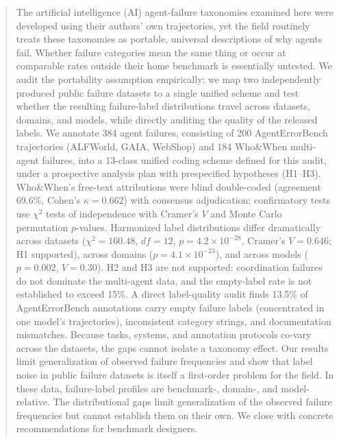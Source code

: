 \documentclass[12pt,letterpaper]{article}
\begin{document}
\begin{abstract}
The artificial intelligence (AI) agent-failure taxonomies examined here were developed using their authors' own trajectories, yet the field routinely treats these taxonomies as portable, universal descriptions of why agents fail. Whether failure categories mean the same thing or occur at comparable rates outside their home benchmark is essentially untested. We audit the portability assumption empirically: we map two independently produced public failure datasets to a single unified scheme and test whether the resulting failure-label distributions travel across datasets, domains, and models, while directly auditing the quality of the released labels. We annotate 384 agent failures, consisting of 200 AgentErrorBench trajectories (ALFWorld, GAIA, WebShop) and 184 Who\&When multi-agent failures, into a 13-class unified coding scheme defined for this audit, under a prospective analysis plan with prespecified hypotheses (H1--H3). Who\&When's free-text attributions were blind double-coded (agreement 69.6\%, Cohen's $\kappa=0.662$) with consensus adjudication; confirmatory tests use $\chi^2$ tests of independence with Cramer's $V$ and Monte Carlo permutation $p$-values. Harmonized label distributions differ dramatically across datasets ($\chi^2=160.48$, $df=12$, $p=4.2\times10^{-28}$, Cramer's $V=0.646$; H1 supported), across domains ($p=4.1\times10^{-23}$), and across models ($p=0.002$, $V=0.30$). H2 and H3 are not supported: coordination failures do not dominate the multi-agent data, and the empty-label rate is not established to exceed 15\%. A direct label-quality audit finds 13.5\% of AgentErrorBench annotations carry empty failure labels (concentrated in one model's trajectories), inconsistent category strings, and documentation mismatches. Because tasks, systems, and annotation protocols co-vary across the datasets, the gaps cannot isolate a taxonomy effect. Our results limit generalization of observed failure frequencies and show that label noise in public failure datasets is itself a first-order problem for the field. In these data, failure-label profiles are benchmark-, domain-, and model-relative. The distributional gaps limit generalization of the observed failure frequencies but cannot establish them on their own. We close with concrete recommendations for benchmark designers.
\end{abstract}
\end{document}
